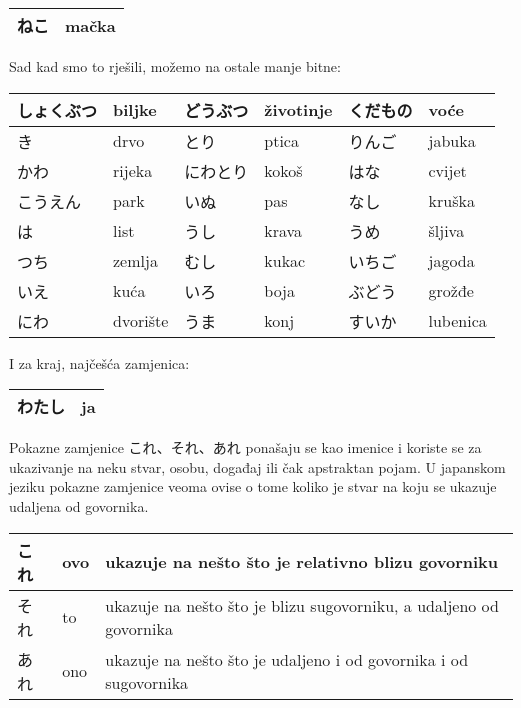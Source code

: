 	\begin{tabular}{|l|l|}
		\hline
		ねこ&mačka\\\hline
	\end{tabular}
	\vspace{10pt}
	
	Sad kad smo to rješili, možemo na ostale manje bitne:
	
	\vspace{10pt}
	\begin{tabular}{|l|l|l|l|l|l|}
		\hline
		しょくぶつ&biljke&どうぶつ&životinje&くだもの&voće\\\hline
		き&drvo&とり&ptica&りんご&jabuka\\\hline
		かわ&rijeka&にわとり&kokoš&はな&cvijet\\\hline
		こうえん&park&いぬ&pas&なし&kruška\\\hline
		は&list&うし&krava&うめ&šljiva\\\hline
		つち&zemlja&むし&kukac&いちご&jagoda\\\hline
		いえ&kuća&いろ&boja&ぶどう&grožđe\\\hline
		にわ&dvorište&うま&konj&すいか&lubenica\\\hline
	\end{tabular}

	
	\vspace{10pt}
	I za kraj, najčešća zamjenica:
	
	\vspace{10pt}
	\begin{tabular}{|l|l|}
		\hline
		わたし&ja\\\hline
	\end{tabular}
	\vspace{10pt}

	

	Pokazne zamjenice これ、それ、あれ ponašaju se kao imenice i koriste se za ukazivanje na neku stvar, osobu, događaj ili čak apstraktan pojam. U japanskom jeziku pokazne zamjenice veoma ovise o tome koliko je stvar na koju se ukazuje udaljena od govornika.
	
	\vspace{10pt}
	\begin{tabular}{|l|l|l|}
		\hline
		これ&ovo&ukazuje na nešto što je relativno blizu govorniku\\\hline
		それ&to&ukazuje na nešto što je blizu sugovorniku, a udaljeno od govornika\\\hline
		あれ&ono&ukazuje na nešto što je udaljeno i od govornika i od sugovornika\\\hline
	\end{tabular}
	\vspace{10pt}
	
